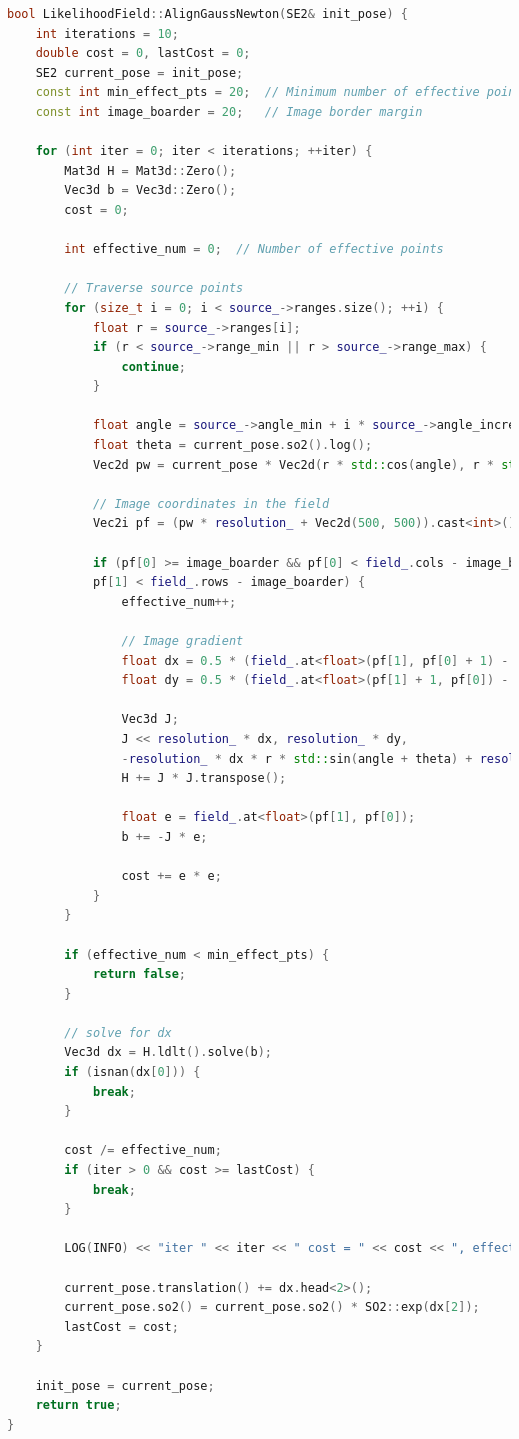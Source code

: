 \begin{lstlisting}[language=c++,caption=src/ch6/likelihood\_field.cc]  
bool LikelihoodField::AlignGaussNewton(SE2& init_pose) {  
	int iterations = 10;  
	double cost = 0, lastCost = 0;  
	SE2 current_pose = init_pose;  
	const int min_effect_pts = 20;  // Minimum number of effective points  
	const int image_boarder = 20;   // Image border margin  
	
	for (int iter = 0; iter < iterations; ++iter) {  
		Mat3d H = Mat3d::Zero();  
		Vec3d b = Vec3d::Zero();  
		cost = 0;  
		
		int effective_num = 0;  // Number of effective points  
		
		// Traverse source points  
		for (size_t i = 0; i < source_->ranges.size(); ++i) {  
			float r = source_->ranges[i];  
			if (r < source_->range_min || r > source_->range_max) {  
				continue;  
			}  
			
			float angle = source_->angle_min + i * source_->angle_increment;  
			float theta = current_pose.so2().log();  
			Vec2d pw = current_pose * Vec2d(r * std::cos(angle), r * std::sin(angle));  
			
			// Image coordinates in the field  
			Vec2i pf = (pw * resolution_ + Vec2d(500, 500)).cast<int>();  
			
			if (pf[0] >= image_boarder && pf[0] < field_.cols - image_boarder && pf[1] >= image_boarder &&  
			pf[1] < field_.rows - image_boarder) {  
				effective_num++;  
				
				// Image gradient  
				float dx = 0.5 * (field_.at<float>(pf[1], pf[0] + 1) - field_.at<float>(pf[1], pf[0] - 1));  
				float dy = 0.5 * (field_.at<float>(pf[1] + 1, pf[0]) - field_.at<float>(pf[1] - 1, pf[0]));  
				
				Vec3d J;  
				J << resolution_ * dx, resolution_ * dy,  
				-resolution_ * dx * r * std::sin(angle + theta) + resolution_ * dy * r * std::cos(angle + theta);  
				H += J * J.transpose();  
				
				float e = field_.at<float>(pf[1], pf[0]);  
				b += -J * e;  
				
				cost += e * e;  
			}  
		}  
		
		if (effective_num < min_effect_pts) {  
			return false;  
		}  
		
		// solve for dx  
		Vec3d dx = H.ldlt().solve(b);  
		if (isnan(dx[0])) {  
			break;  
		}  
		
		cost /= effective_num;  
		if (iter > 0 && cost >= lastCost) {  
			break;  
		}  
		
		LOG(INFO) << "iter " << iter << " cost = " << cost << ", effect num: " << effective_num;  
		
		current_pose.translation() += dx.head<2>();  
		current_pose.so2() = current_pose.so2() * SO2::exp(dx[2]);  
		lastCost = cost;  
	}  
	
	init_pose = current_pose;  
	return true;  
}  
\end{lstlisting}  

